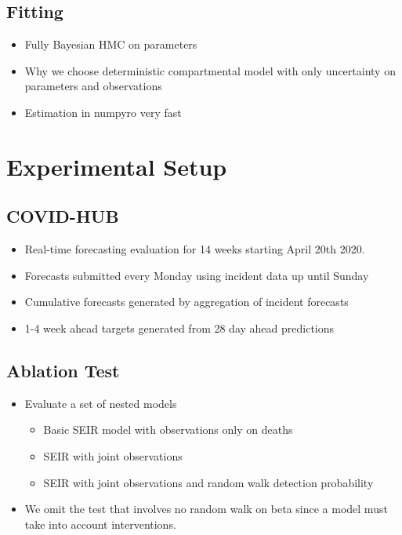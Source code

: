 \documentclass[11pt]{amsart}
\begin{document}
  \subsection{Fitting}

 \begin{itemize}
 \item Fully Bayesian HMC on parameters
 \item Why we choose deterministic compartmental model with only uncertainty on parameters and observations
 \item Estimation in numpyro very fast
   \end{itemize}
   
   
   
 \section{Experimental Setup}
 
 
 \subsection{COVID-HUB}
 \begin{itemize}
 \item Real-time forecasting evaluation for 14 weeks starting April 20th 2020. 
 \item Forecasts submitted every Monday using incident data up until Sunday
 \item Cumulative forecasts generated by aggregation of incident forecasts
 \item 1-4 week ahead targets generated from 28 day ahead predictions 
 \end{itemize}
 
 \subsection{Ablation Test}
 \begin{itemize}
 \item Evaluate a set of nested models
 \begin{itemize}
 \item Basic SEIR model with observations only on deaths
 \item SEIR with joint observations
 \item SEIR with joint observations and random walk detection probability
 \end{itemize}
 \item We omit the test that involves no random walk on beta since a model must take into account interventions.

 
 \end{itemize}
\end{document}
